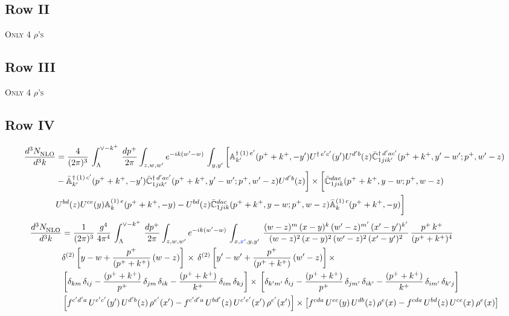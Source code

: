 \documentclass[9pt]{article}
\def\mf#1{\mathbb{#1}}
\numberwithin{equation}{section}
\begin{document}
\subsection{Row II\,}
\textsc{Only 4 $\rho$'s}
\subsection{Row III\,}
\textsc{Only 4 $\rho$'s}
\subsection{Row IV\,}
\begin{align}
    \frac{d^{3}N_{\rm NLO}^{\rm}}{d^{3}k}  & = \frac{4}{(2\pi)^{3}}\,\int_{\Lambda}^{\vee-k^{+}}\, \frac{dp^{+}}{2\pi}\int_{z,w,w^{\prime}} e^{-ik(w^{\prime}-w)}\,  \int_{y,y^{\prime}}\bigg[\mf{A}^{\dagger\, (1)\,e^{\prime}}_{k^{\prime}}(p^{+}+k^{+},-y^{\prime})U^{\dagger\, e^{\prime}c^{\prime}}(y^{\prime})U^{d^{\prime}b}(z) \Bar{\mf{C}}^{\dagger\, d^{\prime}ac^{\prime}}_{1jik^{\prime}}(p^{+}+k^{+},y^{\prime}-w^{\prime}; p^{+},w^{\prime}-z) \notag \\ &  -\Bar{\mf{A}}^{\dagger\, (1)\,c^{\prime}}_{k^{\prime}}(p^{+}+k^{+},-y^{\prime}) \Bar{\mf{C}}^{\dagger\, d^{\prime}ac^{\prime}}_{1jik^{\prime}}(p^{+}+k^{+},y^{\prime}-w^{\prime}; p^{+},w^{\prime}-z)U^{d^{\prime}b}(z)\bigg]\times\bigg[\Bar{\mf{C}}^{dac}_{1jik}(p^{+}+k^{+},y-w; p^{+},w-z)\notag \\ & U^{bd}(z)U^{ce}(y) \mf{A}^{(1)\,e}_{k}(p^{+}+k^{+},-y) -U^{bd}(z) \Bar{\mf{C}}^{dac}_{1jik}(p^{+}+k^{+},y-w; p^{+},w-z)\Bar{\mf{A}}^{(1)\,c}_{k}(p^{+}+k^{+},-y)\bigg]\nonumber
\end{align}
\begin{align}
     \frac{d^{3}N_{\rm NLO}^{\rm}}{d^{3}k}  & = \frac{1}{(2\pi)^{3}}\,\frac{g^{4}}{4\pi^{4}}\,\int_{\Lambda}^{\vee-k^{+}}\, \frac{dp^{+}}{2\pi}\int_{z,w,w^{\prime}} e^{-ik(w^{\prime}-w)}\,  \int_{x,{\color{blue}x'},y,y^{\prime}}\,\frac{(w-z)^{m}\,(x-y)^{k}\,(w'-z)^{m'}\,(x'-y')^{k'}}{(w-z)^{2}\,(x-y)^{2}\,(w'-z)^{2}\,(x'-y')^{2}}\,\frac{p^{+}\,k^{+}}{(p^{+}+k^{+})^{4}}\notag \\ & \delta^{(2)}\left[y-w+\frac{p^{+}}{(p^{+}+k^{+})}\,(w-z)\right]\,\times\, \delta^{(2)}\left[y'-w'+\frac{p^{+}}{(p^{+}+k^{+})}\,(w'-z)\right]\times\notag \\ &  \left[\delta_{km}\,\delta_{ij}-\frac{(p^{+}+k^{+})}{p^{+}}\,\delta_{jm}\,\delta_{ik}-\frac{(p^{+}+k^{+})}{k^{+}}\,\delta_{im}\,\delta_{kj}\right]\times\, \left[\delta_{k'm'}\,\delta_{ij}-\frac{(p^{+}+k^{+})}{p^{+}}\,\delta_{jm'}\,\delta_{ik'}-\frac{(p^{+}+k^{+})}{k^{+}}\,\delta_{im'}\,\delta_{k'j}\right]\notag \\ & \left[f^{c'd'a}\,U^{e'c'}(y')\,U^{d'b}(z)\,\rho^{e'}(x')-f^{c'd'a}\, 
    U^{bd'}(z)\,U^{c'e'}(x')\,\rho^{e'}(x')\right]\times \left[f^{cda}\,U^{ec}(y)\,U^{db}(z)\,\rho^{e}(x)-f^{cda}\, 
    U^{bd}(z)\,U^{ce}(x)\,\rho^{e}(x)\right]
\end{align}
\end{document}
